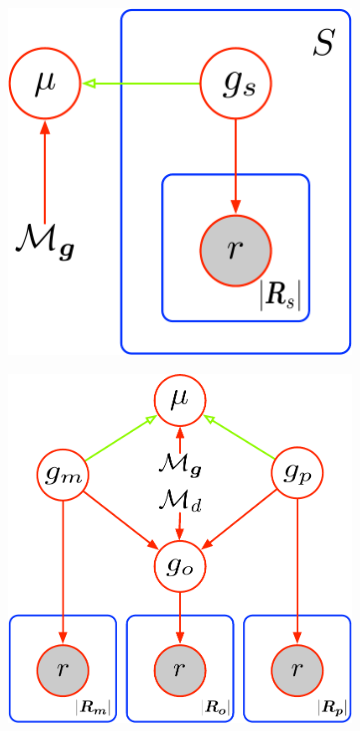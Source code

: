 \documentclass{article}
\begin{document}
\clearpage

\begin{figure}[ht!]
    \centering
    \begin{subfigure}[b]{0.31\textwidth}
        \includegraphics[width=\textwidth]{figures/population_model}
        \caption{}
        \label{supfig:pop}
    \end{subfigure}
    \hfill
    \begin{subfigure}[b]{0.31\textwidth}
        \includegraphics[width=\textwidth]{figures/trio_model}

\end{subfigure}
\end{figure}
\end{document}
